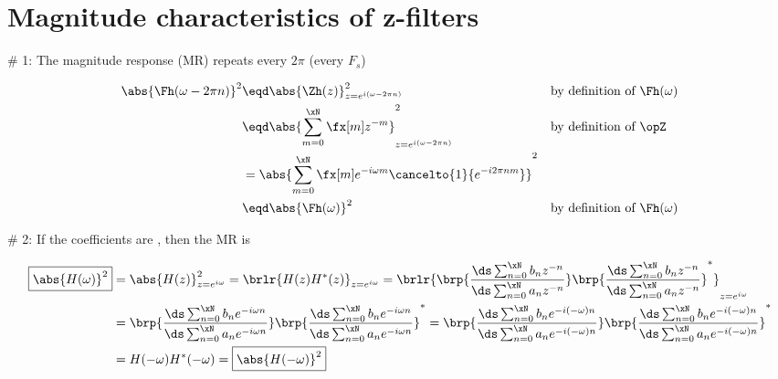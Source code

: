 
\chapter{Magnitude characteristics of z-filters}

\# 1: The magnitude response (MR) repeats every $2\pi$ (every $F_s$)

\begin{align*}
  \abs{\Fh(\omega-2\pi n)}^2
    &\eqd \abs{\Zh(z)}^2_{z=e^{i(\omega-2\pi n)}}
    && \text{by definition of $\Fh(\omega)$}
  \\&\eqd \abs{\sum_{m=0}^{\xN} \fx[m] z^{-m}}^2_{z=e^{i(\omega-2\pi n)}}
    &&\text{by definition of $\opZ$}
  \\&= \abs{\sum_{m=0}^{\xN} \fx[m] e^{-i\omega m}\cancelto{1}{e^{-i2\pi nm}}}^2
  \\&\eqd \abs{\Fh(\omega)}^2
    && \text{by definition of $\Fh(\omega)$}
\end{align*}



\# 2: If the coefficients are , then the MR is 

{\begin{align*}
  \boxed{\abs{H(\omega)}^2}
    &= \abs{H(z)}^2_{z=e^{i\omega}}
     = \brlr{H(z)H^\ast(z)}_{z=e^{i\omega}}
     = \brlr{
         \brp{\frac{\ds\sum_{n=0}^{\xN}b_nz^{-n}}
                   {\ds\sum_{n=0}^{\xN}a_nz^{-n}}}
         \brp{\frac{\ds\sum_{n=0}^{\xN}b_nz^{-n}}
                   {\ds\sum_{n=0}^{\xN}a_nz^{-n}}}^\ast
         }_{z=e^{i\omega}}
  \\&= \brp{\frac{\ds\sum_{n=0}^{\xN}b_ne^{-i\omega n}}
                 {\ds\sum_{n=0}^{\xN}a_ne^{-i\omega n}}}  
       \brp{\frac{\ds\sum_{n=0}^{\xN}b_ne^{-i\omega n}}
                 {\ds\sum_{n=0}^{\xN}a_ne^{-i\omega n}}}^\ast
     = \brp{\frac{\ds\sum_{n=0}^{\xN}b_ne^{-i(-\omega) n}}
                 {\ds\sum_{n=0}^{\xN}a_ne^{-i(-\omega) n}}}  
       \brp{\frac{\ds\sum_{n=0}^{\xN}b_ne^{-i(-\omega) n}}
                 {\ds\sum_{n=0}^{\xN}a_ne^{-i(-\omega) n}}}^\ast
  \\&= H(-\omega)H^\ast(-\omega)
     = \boxed{\abs{H(-\omega)}^2}
\end{align*}}



